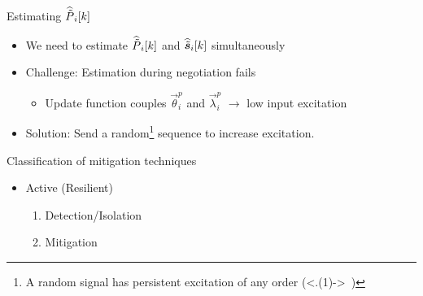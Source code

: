 \documentclass[aspectratio=169]{beamer}
\begin{document}
\begin{frame}{Estimating \small $\widehat{\tilde{P}}_{i}[k]$}
  \centering
  \begin{itemize}[<+(1)->]
    \item We need to estimate $\widehat{\tilde{P}}_{i}[k]$ and $\widehat{\tilde{\boldsymbol{s}}}_{i}[k]$ simultaneously
    \item Challenge: Estimation during negotiation fails
          \begin{itemize}
            \item Update function couples $\vec{\theta}_{i}^{p}$ and $\vec{\lambda}_{i}^{p}$ $\to$ low input excitation
          \end{itemize}
    \item Solution: Send a random\footnote{A random signal has persistent excitation of any order (\visible<.(1)->{\booksymbol~})} sequence to increase excitation.

  \end{itemize}

\end{frame}

\begin{frame}{Classification of mitigation techniques}
  \begin{itemize}
    \item Active (Resilient)
          \begin{enumerate}
            \item Detection/Isolation 
            \item Mitigation 
          \end{enumerate}
  \end{itemize}
\end{frame}
\end{document}
